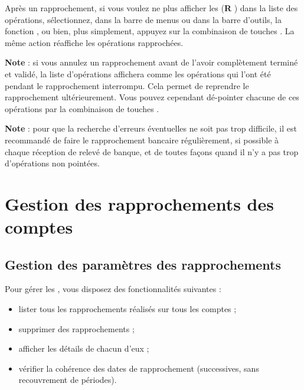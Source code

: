 Après un rapprochement, si vous voulez ne plus afficher les  (\og \textbf{R} \fg{}) dans la liste des opérations, sélectionnez, dans la barre de menus ou dans la barre d'outils, la fonction , ou bien, plus simplement, appuyez sur la combinaison de touches . La même action réaffiche les opérations rapprochées.

\textbf{Note} : si vous annulez un rapprochement avant de l'avoir complètement terminé et validé, la liste d'opérations affichera comme \og {} \fg{} les opérations qui l'ont été pendant le rapprochement interrompu. Cela permet de reprendre le rapprochement ultérieurement. Vous pouvez cependant \og dé-pointer \fg{} chacune de ces opérations par la combinaison de touches .

\textbf{Note} : pour que la recherche d'erreurs éventuelles ne soit pas trop difficile, il est recommandé de faire le rapprochement bancaire régulièrement, si possible à chaque réception de relevé de banque, et de toutes façons quand il n'y a pas trop d'opérations non pointées.


\section{Gestion des rapprochements des comptes\label{reconciliation-manage}}


\subsection{Gestion des paramètres des rapprochements\label{reconciliation-manage-parameters}}

Pour gérer les , vous disposez des fonctionnalités suivantes :

\begin{itemize}
	\item lister tous les rapprochements réalisés sur tous les comptes ;
	\item supprimer des rapprochements ;
	\item afficher les détails de chacun d'eux ;
	\item vérifier la cohérence des dates de rapprochement (successives, sans recouvrement de périodes).
\end{itemize}

